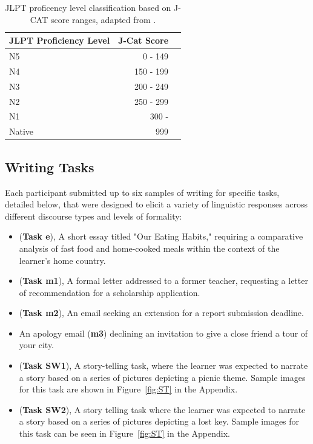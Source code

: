 \begin{table}[h!]
\centering
\begin{tabular}{lrl}
\hline \textbf{JLPT Proficiency Level} & \textbf{J-Cat Score}  \\ \hline
N5 & 0 - 149 \\
N4 & 150 - 199 \\
N3 & 200 - 249 \\
N2 & 250 - 299 \\
N1 & 300 - \\
Native & 999\\
\hline
\end{tabular}
\caption[J-CAT score ranges to their equivalent JLPT Level]{JLPT proficency level classification based on J-CAT score ranges, adapted from
\citet{jcat_interpretation_guide}.}
\label{tab:proficency-table}
\end{table}

\subsection{Writing Tasks}

Each participant submitted up to six samples of writing for specific tasks, detailed below, that were designed to
elicit a variety of linguistic responses across different discourse types and levels of formality:
\begin{itemize}
    \item (\textbf{Task e}), A short essay titled "Our Eating Habits," requiring a comparative analysis of fast food
    and home-cooked
    meals within the context of the learner's home country.
    \item (\textbf{Task m1}), A formal letter addressed to a former teacher, requesting a letter of recommendation
    for a scholarship
    application.
    \item (\textbf{Task m2}), An email seeking an extension for a report submission deadline.
    \item An apology email (\textbf{m3}) declining an invitation to give a close friend a tour of your city.
    \item (\textbf{Task SW1}), A story-telling task, where the learner was expected to narrate a story based on a
    series of pictures depicting a picnic theme. Sample images for this task are shown in Figure~\ref{fig:ST}
    in the Appendix.
    \item (\textbf{Task SW2}), A story telling task where the learner was expected to narrate a story based on a
    series of pictures depicting a lost key. Sample images for this task can be seen in Figure~\ref{fig:ST} in the
    Appendix.
\end{itemize}

